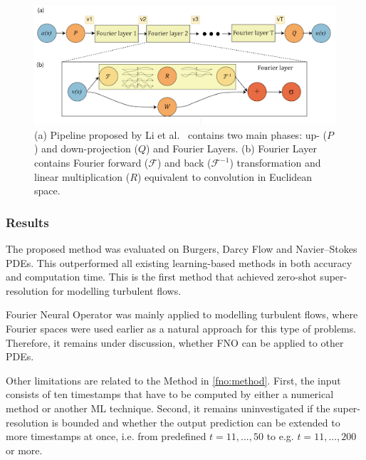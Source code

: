 \begin{figure}
	\centering
	\includegraphics[width=12cm]{figures/fno.png}
	\caption{(a) Pipeline proposed by Li et al.~\cite{Li20} contains two main phases: up- ($P$) and down-projection ($Q$) and Fourier Layers. (b) Fourier Layer contains Fourier forward ($\mathcal{F}$) and back ($\mathcal{F}^{-1}$) transformation and linear multiplication ($R$) equivalent to convolution in Euclidean space.}
	\label{fig:fno}
\end{figure}  

\subsubsection{Results}
The proposed method was evaluated on Burgers, Darcy Flow and Navier--Stokes PDEs. This outperformed all existing learning-based methods in both accuracy and computation time. This is the first method that achieved zero-shot super-resolution for modelling turbulent flows. 

Fourier Neural Operator was mainly applied to modelling turbulent flows, where Fourier spaces were used earlier as a natural approach for this type of problems. Therefore, it remains under discussion, whether FNO can be applied to other PDEs.

Other limitations are related to the Method in \cref{fno:method}. First, the input consists of ten timestamps that have to be computed by either a numerical method or another ML technique. Second, it remains uninvestigated if the super-resolution is bounded and whether the output prediction can be extended to more timestamps at once, i.e. from predefined $t=11,...,50$ to e.g. $t=11,...,200$ or more.



